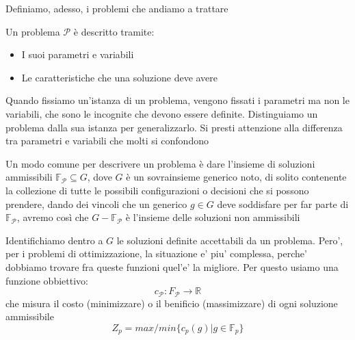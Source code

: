 Definiamo, adesso, i problemi che andiamo a trattare

Un problema $ \mathcal{P} $ è descritto tramite:
\begin{itemize}
  \item I suoi parametri e variabili
  \item Le caratteristiche che una soluzione deve avere
\end{itemize}

Quando fissiamo un'istanza di un problema, vengono fissati i parametri ma non le variabili, che sono le incognite che devono essere definite. Distinguiamo un problema dalla sua istanza per generalizzarlo. Si presti attenzione alla differenza tra parametri e variabili che molti si confondono

Un modo comune per descrivere un problema è dare l'insieme di soluzioni ammissibili $ \mathbb{F}_{\mathcal{P}} \subseteq G $, dove $G$ è un sovrainsieme generico noto, di solito contenente la collezione di tutte le possibili configurazioni o decisioni che si possono prendere, dando dei vincoli che un generico $ g \in G $ deve soddisfare per far parte di $\mathbb{F}_{\mathcal{P}}$, avremo così che $G - \mathbb{F}_{\mathcal{P}}$ è l'insieme delle soluzioni non ammissibili 

Identifichiamo dentro a $ G $ le soluzioni definite accettabili da un problema. Pero', per i problemi di ottimizzazione, la situazione e' piu' complessa, perche' dobbiamo trovare fra queste funzioni quel'e' la migliore. Per questo usiamo una funzione obbiettivo:
\[
  c_{\mathcal{P}}: F_\mathcal{P} \to \mathbb{R}
\]
che misura il costo (minimizzare) o il benificio (massimizzare) di ogni soluzione ammissibile
\[
  Z_p = max/min\{c_p(g) | g \in \mathbb{F}_p\}
\]

